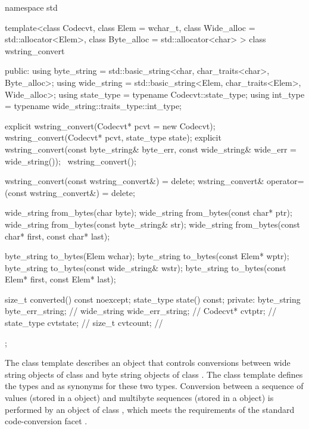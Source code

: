 %
\begin{codeblock}
namespace std {
template<class Codecvt, class Elem = wchar_t,
    class Wide_alloc = std::allocator<Elem>,
    class Byte_alloc = std::allocator<char> > class wstring_convert {
  public:
    using byte_string = std::basic_string<char, char_traits<char>, Byte_alloc>;
    using wide_string = std::basic_string<Elem, char_traits<Elem>, Wide_alloc>;
    using state_type  = typename Codecvt::state_type;
    using int_type    = typename wide_string::traits_type::int_type;

    explicit wstring_convert(Codecvt* pcvt = new Codecvt);
    wstring_convert(Codecvt* pcvt, state_type state);
    explicit wstring_convert(const byte_string& byte_err,
                             const wide_string& wide_err = wide_string());
    ~wstring_convert();

    wstring_convert(const wstring_convert&) = delete;
    wstring_convert& operator=(const wstring_convert&) = delete;

    wide_string from_bytes(char byte);
    wide_string from_bytes(const char* ptr);
    wide_string from_bytes(const byte_string& str);
    wide_string from_bytes(const char* first, const char* last);

    byte_string to_bytes(Elem wchar);
    byte_string to_bytes(const Elem* wptr);
    byte_string to_bytes(const wide_string& wstr);
    byte_string to_bytes(const Elem* first, const Elem* last);

    size_t converted() const noexcept;
    state_type state() const;
  private:
    byte_string byte_err_string;    // \expos
    wide_string wide_err_string;    // \expos
    Codecvt* cvtptr;                // \expos
    state_type cvtstate;            // \expos
    size_t cvtcount;                // \expos
  };
}
\end{codeblock}

\pnum
The class template describes an object that controls conversions between wide
string objects of class  and byte string objects of class . The class template defines the types
 and  as synonyms for these two types.
Conversion between a sequence of  values (stored in a
 object) and multibyte sequences (stored in a
 object) is performed by an object of class
, which meets the
requirements of the standard code-conversion facet .

